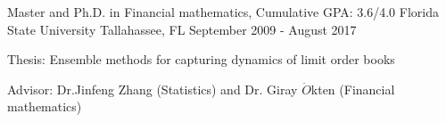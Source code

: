 \begin{cventries}
  \cventry
    {Master and Ph.D. in Financial mathematics, Cumulative GPA: 3.6/4.0}
    {Florida State University}
    {Tallahassee, FL}
    {September 2009 - August 2017}
	{
	\begin{cvitems}
	                \item{Thesis: Ensemble methods for capturing dynamics of limit order books}
	                \item {Advisor: Dr.Jinfeng Zhang (Statistics) and Dr. Giray $\ddot{O}$kten (Financial mathematics)}
	\end{cvitems}	
	}

\end{cventries}
